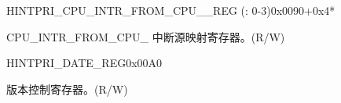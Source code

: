 \begin{register}{H}{INTPRI\_CPU\_INTR\_FROM\_CPU\_\_REG (: 0-3)}{0x0090+0x4*}\label{regdesc:INTPRICPUINTRFROMCPUNREG}
%
%
\regnewline%
\begin{regdesc}\begin{reglist}
\label{fielddesc:INTPRICPUINTRFROMCPUN}\item [INTPRI\_CPU\_INTR\_FROM\_CPU\_\regindex{n}] CPU\_INTR\_FROM\_CPU\_ 中断源映射寄存器。(R/W)
\end{reglist}\end{regdesc}
\end{register}


\begin{register}{H}{INTPRI\_DATE\_REG}{0x00A0}\label{regdesc:INTPRIDATEREG}
%
%
\regnewline%
\begin{regdesc}\begin{reglist}
\label{fielddesc:INTPRIDATE}\item [INTPRI\_DATE] 版本控制寄存器。(R/W)
\end{reglist}\end{regdesc}
\end{register}

